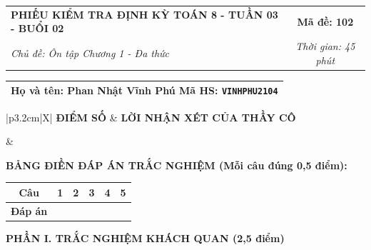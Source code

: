 \documentclass[12pt,a4paper]{article}
\begin{document}
\newpage


\noindent
\begin{tabularx}{\linewidth}{|X|c|}
\hline
\textbf{PHIẾU KIỂM TRA ĐỊNH KỲ TOÁN 8 - TUẦN 03 - BUỔI 02} & \textbf{Mã đề: 102} \\
\textit{Chủ đề: Ôn tập Chương 1 - Đa thức} & \textit{Thời gian: 45 phút} \\
\hline
\end{tabularx}

\vspace{1mm}

\noindent
\begin{tabularx}{\linewidth}{|X|}
\hline
\rule[-2mm]{0pt}{7.5mm}\textbf{Họ và tên:} \textbf{\large Phan Nhật Vĩnh Phú} \hfill \textbf{Mã HS:} \texttt{VINHPHU2104} \quad \\
\hline
\end{tabularx}

\vspace{1mm}

\noindent
\begin{tabularx}{\linewidth}{|p{3.2cm}|X|}
\hline
\centering\textbf{ĐIỂM SỐ} & \centering\textbf{LỜI NHẬN XÉT CỦA THẦY CÔ} \tabularnewline
\hline
\rule{0pt}{1.3cm} & \tabularnewline
\hline
\end{tabularx}

\vspace{1.2mm}

\noindent\textbf{BẢNG ĐIỀN ĐÁP ÁN TRẮC NGHIỆM (Mỗi câu đúng 0,5 điểm):}
\vspace{0.8mm}

\noindent
\renewcommand{\arraystretch}{1.35}
\begin{tabularx}{\linewidth}{|c|*{5}{>{\centering\arraybackslash}X|}}
\hline
\textbf{Câu} & \textbf{1} & \textbf{2} & \textbf{3} & \textbf{4} & \textbf{5} \\
\hline
\textbf{Đáp án} & & & & & \\
\hline
\end{tabularx}
\renewcommand{\arraystretch}{1.0}

\vspace{1.5mm}

\noindent\textbf{\large PHẦN I. TRẮC NGHIỆM KHÁCH QUAN (2,5 điểm)}
\vspace{1mm}
\end{document}
